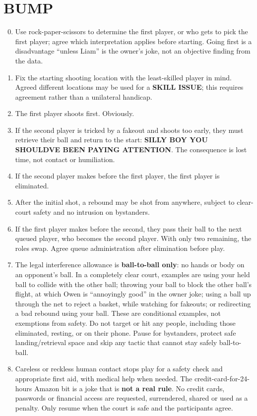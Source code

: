 \documentclass[11pt]{article}
\begin{document}
\section{BUMP}
\begin{enumerate}[start=0]
\setcounter{enumi}{-1}
\item Use rock-paper-scissors to determine the first player, or who gets to pick
the first player; agree which interpretation applies before starting. Going
first is a disadvantage ``unless Liam'' is the owner's joke, not an objective
finding from the data.
\item Fix the starting shooting location with the least-skilled player in
mind. Agreed different locations may be used for a \textbf{SKILL ISSUE}; this
requires agreement rather than a unilateral handicap.
\item The first player shoots first. Obviously.
\item If the second player is tricked by a fakeout and shoots too early, they
must retrieve their ball and return to the start: \textbf{SILLY BOY YOU SHOULDVE
BEEN PAYING ATTENTION}. The consequence is lost time, not contact or humiliation.
\item If the second player makes before the first player, the first player is
eliminated.
\item After the initial shot, a rebound may be shot from anywhere, subject to
clear-court safety and no intrusion on bystanders.
\item If the first player makes before the second, they pass their ball to the
next queued player, who becomes the second player. With only two remaining,
the roles swap. Agree queue administration after elimination before play.
\item The legal interference allowance is \textbf{ball-to-ball only}: no hands
or body on an opponent's ball. In a completely clear court, examples are using
your held ball to collide with the other ball; throwing your ball to block the
other ball's flight, at which Owen is ``annoyingly good'' in the owner joke;
using a ball up through the net to reject a basket, while watching for fakeouts;
or redirecting a bad rebound using your ball. These are conditional examples,
not exemptions from safety. Do not target or hit any people, including those
eliminated, resting, or on their phone. Pause for bystanders, protect safe
landing/retrieval space and skip any tactic that cannot stay safely ball-to-ball.
\item Careless or reckless human contact stops play for a safety check and
appropriate first aid, with medical help when needed. The credit-card-for-24-hours
Amazon bit is a joke that is \textbf{not a real rule}. No credit cards, passwords
or financial access are requested, surrendered, shared or used as a penalty.
Only resume when the court is safe and the participants agree.
\end{enumerate}
\end{document}
